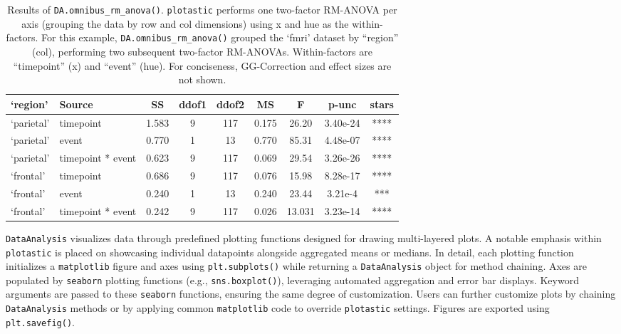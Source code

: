 \begin{table}[H]
    \small
    \centering
    \caption{Results of \texttt{DA.omnibus\_rm\_anova()}. \texttt{plotastic}
        performs one two-factor RM-ANOVA per axis (grouping the data by row and
        col dimensions) using x and hue as the within-factors. For this example,
        \texttt{DA.omnibus\_rm\_anova()} grouped the `fmri' dataset by ``region''
        (col), performing two subsequent two-factor RM-ANOVAs. Within-factors are
        ``timepoint'' (x) and ``event'' (hue). For conciseness, GG-Correction and
        effect sizes are not shown. \selfplagiarismtwo}
    \begin{tabular}{llccccccc}
        \hline
        `region'   & Source            & SS    & ddof1 & ddof2 & MS    & F      & p-unc    & stars \\
        \hline
        `parietal' & timepoint         & 1.583 & 9     & 117   & 0.175 & 26.20  & 3.40e-24 & ****  \\
        `parietal' & event             & 0.770 & 1     & 13    & 0.770 & 85.31  & 4.48e-07 & ****  \\
        `parietal' & timepoint * event & 0.623 & 9     & 117   & 0.069 & 29.54  & 3.26e-26 & ****  \\
        `frontal'  & timepoint         & 0.686 & 9     & 117   & 0.076 & 15.98  & 8.28e-17 & ****  \\
        `frontal'  & event             & 0.240 & 1     & 13    & 0.240 & 23.44  & 3.21e-4  & ***   \\
        `frontal'  & timepoint * event & 0.242 & 9     & 117   & 0.026 & 13.031 & 3.23e-14 & ****  \\
        \hline
    \end{tabular}
    \label{tab:RMANOVA}
    \vspace{\vfull} %
\end{table}

\texttt{DataAnalysis} visualizes data through predefined plotting functions
designed for drawing multi-layered plots. A notable emphasis within
\texttt{plotastic} is placed on showcasing individual datapoints alongside
aggregated means or medians. In detail, each plotting function
initializes a \texttt{matplotlib} figure and axes using \texttt{plt.subplots()} while
returning a \texttt{DataAnalysis} object for method chaining. Axes are
populated by \texttt{seaborn} plotting functions (e.g., \texttt{sns.boxplot()}),
leveraging automated aggregation and error bar displays. Keyword
arguments are passed to these \texttt{seaborn} functions, ensuring the same
degree of customization. Users can further customize plots
by chaining \texttt{DataAnalysis} methods or by applying common \texttt{matplotlib} code
to override \texttt{plotastic} settings. Figures are exported using
\texttt{plt.savefig()}.

